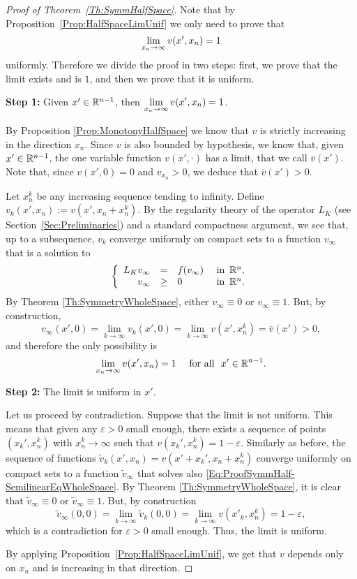 \begin{proof}[Proof of Theorem~\ref{Th:SymmHalfSpace}]
Note that by Proposition~\ref{Prop:HalfSpaceLimUnif} we only need to prove that
$$
\displaystyle \lim_{x_n\to \infty} v(x',x_n) = 1
$$
uniformly. Therefore we divide the proof in two steps: first, we prove that the limit exists and is $1$, and then we prove that it is uniform.


\textbf{Step 1:} Given $x'\in \mathbb{R}^{n-1}$, then  $\displaystyle \lim_{x_n\to \infty} v(x',x_n) = 1$.

By Proposition \ref{Prop:MonotonyHalfSpace} we know that $v$ is strictly increasing in the direction $x_n$. Since $v$ is also bounded by hypothesis, we know that, given $x'\in\mathbb{R}^{n-1}$, the one variable function $v(x',\cdot)$ has a limit, that we call $\overline{v}(x')$. Note that, since $v(x',0) = 0$ and $v_{x_n}>0$, we deduce that $\overline{v}(x') > 0$.

Let $x_n^k$ be any increasing sequence tending to infinity. Define $v_k(x',x_n) := v(x',x_n+x_n^k)$. By the regularity theory of the operator $L_K $ (see Section~\ref{Sec:Preliminaries}) and a standard compactness argument, we see that, up to a subsequence, $v_k$ converge uniformly on compact sets to a function $v_\infty$ that is a solution to
\begin{equation}
\label{Eq:ProofSymmHalf-SemilinearEqWholeSpace}
\left\{\begin{array}{rcll}
L_K v_\infty &=& f(v_\infty)   &\textrm{ in } \,\mathbb{R}^n,\\
v_\infty &\geq& 0   &\textrm{ in } \,\mathbb{R}^n.
\end{array} \right.
\end{equation}
By Theorem \ref{Th:SymmetryWholeSpace}, either $v_\infty\equiv 0$ or $v_\infty \equiv 1$. But, by construction,
$$ v_\infty(x',0) = \lim_{k\to \infty} v_k(x',0) = \lim_{k\to \infty} v(x',x_n^k) = \overline{v}(x') > 0, $$
and therefore the only possibility is
$$ \lim_{x_n\to \infty} v(x',x_n) = 1 \quad \text{ for all } \ x'\in\mathbb{R}^{n-1}. $$

\textbf{Step 2:} The limit is uniform in $x'$.

Let us proceed by contradiction. Suppose that the limit is not uniform. This means that given any $\varepsilon>0$ small enough, there exists a sequence of points $(x_k',x_n^k)$ with $x_n^k\to \infty$ such that $v(x_k',x_n^k) = 1-\varepsilon$. Similarly as before, the sequence of functions $\tilde{v}_k(x',x_n) = v(x'+x_k',x_n+x_n^k)$ converge uniformly on compact sets to a function $\tilde{v}_\infty$ that solves also \eqref{Eq:ProofSymmHalf-SemilinearEqWholeSpace}. By Theorem \ref{Th:SymmetryWholeSpace}, it is clear that $\tilde{v}_\infty\equiv 0$ or $\tilde{v}_\infty \equiv 1$. But, by construction
$$ \tilde{v}_\infty(0,0) = \lim_{k\to \infty} \tilde{v}_k(0,0) = \lim_{k\to \infty} v(x'_k,x_n^k) = 1-\varepsilon, $$
which is a contradiction for $\varepsilon>0$ small enough. Thus, the limit is uniform.

By applying Proposition~\ref{Prop:HalfSpaceLimUnif}, we get that $v$ depends only on $x_n$ and is increasing in that direction.
\end{proof}

